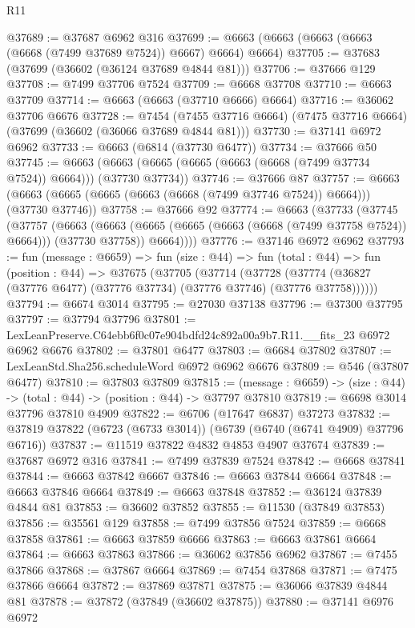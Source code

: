 \begin{lexlean}{R11}
\begin{coremodule}
@37689 := @37687 @6962 @316
@37699 := @6663 (@6663 (@6663 (@6663 (@6668 (@7499 @37689 @7524)) @6667) @6664) @6664)
@37705 := @37683 (@37699 (@36602 (@36124 @37689 @4844 @81)))
@37706 := @37666 @129
@37708 := @7499 @37706 @7524
@37709 := @6668 @37708
@37710 := @6663 @37709
@37714 := @6663 (@6663 (@37710 @6666) @6664)
@37716 := @36062 @37706 @6676
@37728 := @7454
    (@7455 @37716 @6664)
    (@7475 @37716 @6664)
    (@37699 (@36602 (@36066 @37689 @4844 @81)))
@37730 := @37141 @6972 @6962
@37733 := @6663 (@6814 (@37730 @6477))
@37734 := @37666 @50
@37745 := @6663 (@6663 (@6665 (@6665 (@6663 (@6668 (@7499 @37734 @7524)) @6664))) (@37730 @37734))
@37746 := @37666 @87
@37757 := @6663 (@6663 (@6665 (@6665 (@6663 (@6668 (@7499 @37746 @7524)) @6664))) (@37730 @37746))
@37758 := @37666 @92
@37774 := @6663
    (@37733
      (@37745
        (@37757
          (@6663
            (@6663 (@6665 (@6665 (@6663 (@6668 (@7499 @37758 @7524)) @6664))) (@37730 @37758))
            @6664))))
@37776 := @37146 @6972 @6962
@37793 := fun (message : @6659) =>
  fun (size : @44) =>
  fun (total : @44) =>
  fun (position : @44) =>
  @37675
    (@37705
      (@37714
        (@37728 (@37774 (@36827 (@37776 @6477) (@37776 @37734) (@37776 @37746) (@37776 @37758))))))
@37794 := @6674 @3014
@37795 := @27030 @37138
@37796 := @37300 @37795
@37797 := @37794 @37796
@37801 := LexLeanPreserve.C64ebb6f0c07e904bdfd24c892a00a9b7.R11.__fits_23 @6972 @6962 @6676
@37802 := @37801 @6477
@37803 := @6684 @37802
@37807 := LexLeanStd.Sha256.scheduleWord @6972 @6962 @6676
@37809 := @546 (@37807 @6477)
@37810 := @37803 @37809
@37815 := (message : @6659) -> (size : @44) -> (total : @44) -> (position : @44) -> @37797 @37810
@37819 := @6698 @3014 @37796 @37810 @4909
@37822 := @6706 (@17647 @6837) @37273
@37832 := @37819 @37822 (@6723 (@6733 @3014)) (@6739 (@6740 (@6741 @4909) @37796 @6716))
@37837 := @11519 @37822 @4832 @4853 @4907 @37674
@37839 := @37687 @6972 @316
@37841 := @7499 @37839 @7524
@37842 := @6668 @37841
@37844 := @6663 @37842 @6667
@37846 := @6663 @37844 @6664
@37848 := @6663 @37846 @6664
@37849 := @6663 @37848
@37852 := @36124 @37839 @4844 @81
@37853 := @36602 @37852
@37855 := @11530 (@37849 @37853)
@37856 := @35561 @129
@37858 := @7499 @37856 @7524
@37859 := @6668 @37858
@37861 := @6663 @37859 @6666
@37863 := @6663 @37861 @6664
@37864 := @6663 @37863
@37866 := @36062 @37856 @6962
@37867 := @7455 @37866
@37868 := @37867 @6664
@37869 := @7454 @37868
@37871 := @7475 @37866 @6664
@37872 := @37869 @37871
@37875 := @36066 @37839 @4844 @81
@37878 := @37872 (@37849 (@36602 @37875))
@37880 := @37141 @6976 @6972

\end{coremodule}
\end{lexlean}
